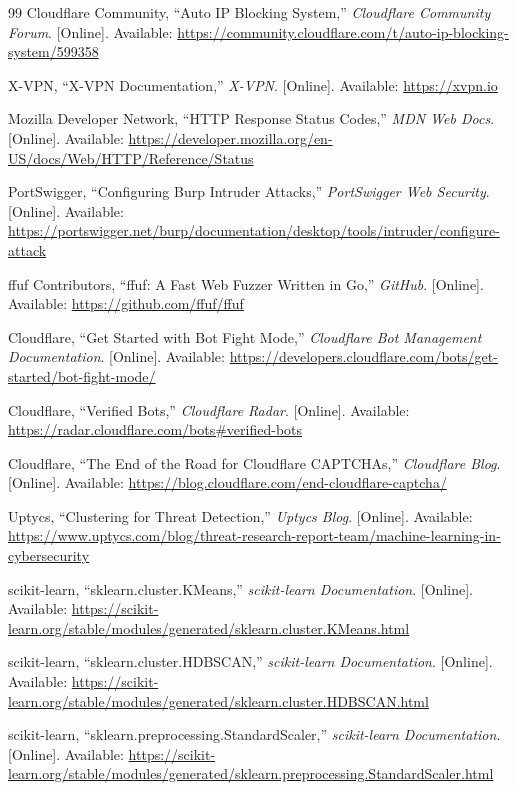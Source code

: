 \documentclass[12pt, a4paper]{report}   %
\begin{document}
\begin{thebibliography}{99}
Cloudflare Community, ``Auto IP Blocking System,'' \textit{Cloudflare Community
Forum}. [Online]. Available:
\url{https://community.cloudflare.com/t/auto-ip-blocking-system/599358}

X-VPN, ``X-VPN Documentation,'' \textit{X-VPN}. [Online]. Available:
\url{https://xvpn.io}

Mozilla Developer Network, ``HTTP Response Status Codes,'' \textit{MDN Web Docs}.
[Online]. Available:
\url{https://developer.mozilla.org/en-US/docs/Web/HTTP/Reference/Status}

PortSwigger, ``Configuring Burp Intruder Attacks,'' \textit{PortSwigger Web
Security}. [Online]. Available:
\url{https://portswigger.net/burp/documentation/desktop/tools/intruder/configure-attack}

ffuf Contributors, ``ffuf: A Fast Web Fuzzer Written in Go,'' \textit{GitHub}.
[Online]. Available: \url{https://github.com/ffuf/ffuf}

Cloudflare, ``Get Started with Bot Fight Mode,'' \textit{Cloudflare Bot Management
Documentation}. [Online]. Available:
\url{https://developers.cloudflare.com/bots/get-started/bot-fight-mode/}

Cloudflare, ``Verified Bots,'' \textit{Cloudflare Radar}. [Online]. Available:
\url{https://radar.cloudflare.com/bots\#verified-bots}

Cloudflare, ``The End of the Road for Cloudflare CAPTCHAs,'' \textit{Cloudflare
Blog}. [Online]. Available:
\url{https://blog.cloudflare.com/end-cloudflare-captcha/}

Uptycs, ``Clustering for Threat Detection,'' \textit{Uptycs Blog}. [Online].
Available:
\url{https://www.uptycs.com/blog/threat-research-report-team/machine-learning-in-cybersecurity}

scikit-learn, ``sklearn.cluster.KMeans,'' \textit{scikit-learn Documentation}.
[Online]. Available:
\url{https://scikit-learn.org/stable/modules/generated/sklearn.cluster.KMeans.html}

scikit-learn, ``sklearn.cluster.HDBSCAN,'' \textit{scikit-learn Documentation}.
[Online]. Available:
\url{https://scikit-learn.org/stable/modules/generated/sklearn.cluster.HDBSCAN.html}

scikit-learn, ``sklearn.preprocessing.StandardScaler,'' \textit{scikit-learn
Documentation}. [Online]. Available:
\url{https://scikit-learn.org/stable/modules/generated/sklearn.preprocessing.StandardScaler.html}


\end{thebibliography}
\end{document}
